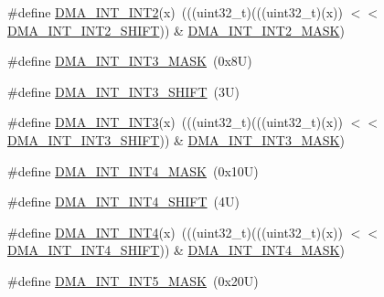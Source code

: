 \begin{DoxyCompactItemize}
\#define \mbox{\hyperlink{group___d_m_a___register___masks_ga69f9822dcc6f437c7f2c6f70a4ed41df}{D\+M\+A\+\_\+\+I\+N\+T\+\_\+\+I\+N\+T2}}(x)~(((uint32\+\_\+t)(((uint32\+\_\+t)(x)) $<$$<$ \mbox{\hyperlink{group___d_m_a___register___masks_gad06728afa85b6e94aa8756fb96f40e11}{D\+M\+A\+\_\+\+I\+N\+T\+\_\+\+I\+N\+T2\+\_\+\+S\+H\+I\+FT}})) \& \mbox{\hyperlink{group___d_m_a___register___masks_gaebc5eed7d9da43d58a7107731c4766dc}{D\+M\+A\+\_\+\+I\+N\+T\+\_\+\+I\+N\+T2\+\_\+\+M\+A\+SK}})
\item 
\#define \mbox{\hyperlink{group___d_m_a___register___masks_gabe809f1f2975a4851af4c671e6f2a3a5}{D\+M\+A\+\_\+\+I\+N\+T\+\_\+\+I\+N\+T3\+\_\+\+M\+A\+SK}}~(0x8\+U)
\item 
\#define \mbox{\hyperlink{group___d_m_a___register___masks_gaba8676e549d454d85e9ea4ed84a7d143}{D\+M\+A\+\_\+\+I\+N\+T\+\_\+\+I\+N\+T3\+\_\+\+S\+H\+I\+FT}}~(3\+U)
\item 
\#define \mbox{\hyperlink{group___d_m_a___register___masks_gaf17b431d0bf04546f1818f723bded5bd}{D\+M\+A\+\_\+\+I\+N\+T\+\_\+\+I\+N\+T3}}(x)~(((uint32\+\_\+t)(((uint32\+\_\+t)(x)) $<$$<$ \mbox{\hyperlink{group___d_m_a___register___masks_gaba8676e549d454d85e9ea4ed84a7d143}{D\+M\+A\+\_\+\+I\+N\+T\+\_\+\+I\+N\+T3\+\_\+\+S\+H\+I\+FT}})) \& \mbox{\hyperlink{group___d_m_a___register___masks_gabe809f1f2975a4851af4c671e6f2a3a5}{D\+M\+A\+\_\+\+I\+N\+T\+\_\+\+I\+N\+T3\+\_\+\+M\+A\+SK}})
\item 
\#define \mbox{\hyperlink{group___d_m_a___register___masks_gaabae890b96a56c9aeae3cfc52370802e}{D\+M\+A\+\_\+\+I\+N\+T\+\_\+\+I\+N\+T4\+\_\+\+M\+A\+SK}}~(0x10\+U)
\item 
\#define \mbox{\hyperlink{group___d_m_a___register___masks_gad9a9fad542ba546abdd79542b30a5cb7}{D\+M\+A\+\_\+\+I\+N\+T\+\_\+\+I\+N\+T4\+\_\+\+S\+H\+I\+FT}}~(4\+U)
\item 
\#define \mbox{\hyperlink{group___d_m_a___register___masks_gafd60a1e4ad7d6371e0701194488ae74e}{D\+M\+A\+\_\+\+I\+N\+T\+\_\+\+I\+N\+T4}}(x)~(((uint32\+\_\+t)(((uint32\+\_\+t)(x)) $<$$<$ \mbox{\hyperlink{group___d_m_a___register___masks_gad9a9fad542ba546abdd79542b30a5cb7}{D\+M\+A\+\_\+\+I\+N\+T\+\_\+\+I\+N\+T4\+\_\+\+S\+H\+I\+FT}})) \& \mbox{\hyperlink{group___d_m_a___register___masks_gaabae890b96a56c9aeae3cfc52370802e}{D\+M\+A\+\_\+\+I\+N\+T\+\_\+\+I\+N\+T4\+\_\+\+M\+A\+SK}})
\item 
\#define \mbox{\hyperlink{group___d_m_a___register___masks_gaa64e6e390afc73afa32ca2326ecdd5a6}{D\+M\+A\+\_\+\+I\+N\+T\+\_\+\+I\+N\+T5\+\_\+\+M\+A\+SK}}~(0x20\+U)
\item 
$$
\end{DoxyCompactItemize}
